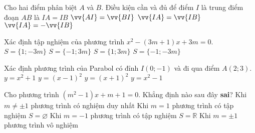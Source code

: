 \begin{ex}%
Cho hai điểm phân biệt $A$ và $B$. Điều kiện cần và đủ để điểm $I$ là trung điểm đoạn $AB$ là
\choice
{$IA=IB$}
{$\vv{AI}=\vv{BI}$}
{$\vv{IA}=\vv{IB}$}
{\True $\vv{IA}=-\vv{IB}$}
\end{ex}
\begin{ex}%
Xác định tập nghiệm của phương trình $x^2-(3m+1)x+3m=0$.
\choice
{$S=\{1;-3m\}$}
{$S=\{-1;3m\}$}
{\True $S=\{1;3m\}$}
{$S=\{-1;-3m\}$}
\end{ex}

\begin{ex}%
Xác định phương trình của Parabol có đỉnh $I(0;-1)$ và đi qua điểm $A(2;3)$.
\choice
{$y=x^2+1$}
{$y=(x-1)^2$}
{$y=(x+1)^2$}
{\True $y=x^2-1$}
\end{ex}

\begin{ex}%
Cho phương trình $(m^2-1)x+m+1=0$. Khẳng định nào sau đây {\bf sai}?
\choice
{Khi $m\ne\pm1$ phương trình có nghiệm duy nhất}
{Khi $m=1$ phương trình có tập nghiệm $S=\varnothing$}
{Khi $m=-1$ phương trình có tập nghiệm $S=\mathbb R$}
{\True Khi $m=\pm1$ phương trình vô nghiệm}
\end{ex}

